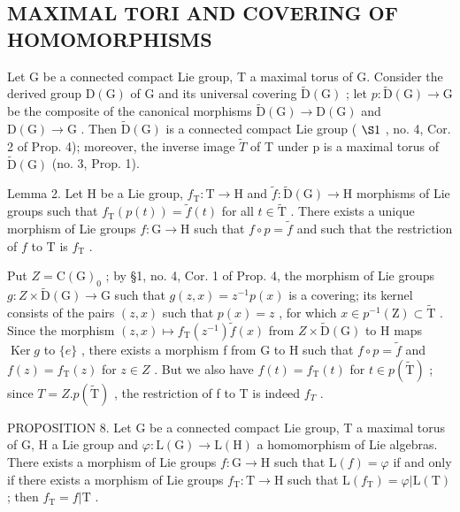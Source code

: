 \subsection{MAXIMAL TORI AND COVERING OF HOMOMORPHISMS}

Let G be a connected compact Lie group, T a maximal torus of G. Consider the derived group \(\mathrm{D}(\mathrm{G})\) of G and its universal covering \(\tilde{\mathrm{D}}(\mathrm{G})\) ; let \(p: \tilde{\mathrm{D}}(\mathrm{G}) \to \mathrm{G}\) be the composite of the canonical morphisms \(\tilde{\mathrm{D}}(\mathrm{G}) \to \mathrm{D}(\mathrm{G})\) and \(\mathrm{D}(\mathrm{G}) \to \mathrm{G}\) . Then \(\tilde{\mathrm{D}}(\mathrm{G})\) is a connected compact Lie group ( \(\S1\) , no. 4, Cor. 2 of Prop. 4); moreover, the inverse image \(\tilde{T}\) of T under p is a maximal torus of \(\tilde{\mathrm{D}}(\mathrm{G})\) (no. 3, Prop. 1).

Lemma 2. Let H be a Lie group, \(f_{\mathrm{T}}: \mathrm{T} \to \mathrm{H}\) and \(\tilde{f}: \tilde{\mathrm{D}}(\mathrm{G}) \to \mathrm{H}\) morphisms of Lie groups such that \(f_{\mathrm{T}}(p(t)) = \tilde{f}(t)\) for all \(t \in \tilde{\mathrm{T}}\) . There exists a unique morphism of Lie groups \(f: \mathrm{G} \to \mathrm{H}\) such that \(f \circ p = \tilde{f}\) and such that the restriction of \(f\) to \(\mathrm{T}\) is \(f_{\mathrm{T}}\) .

Put \(Z = \mathrm{C}(\mathrm{G})_{0}\) ; by §1, no. 4, Cor. 1 of Prop. 4, the morphism of Lie groups \(g: Z \times \tilde{\mathrm{D}}(\mathrm{G}) \to \mathrm{G}\) such that \(g(z, x) = z^{-1} p(x)\) is a covering; its kernel consists of the pairs \((z, x)\) such that \(p(x) = z\) , for which \(x \in p^{-1}(\mathrm{Z}) \subset \tilde{\mathrm{T}}\) . Since the morphism \((z, x) \mapsto f_{\mathrm{T}}(z^{-1}) \tilde{f}(x)\) from \(Z \times \tilde{\mathrm{D}}(\mathrm{G})\) to H maps \(\operatorname{Ker} g\) to \(\{e\}\) , there exists a morphism f from G to H such that \(f \circ p = \tilde{f}\) and \(f(z) = f_{\mathrm{T}}(z)\) for \(z \in Z\) . But we also have \(f(t) = f_{\mathrm{T}}(t)\) for \(t \in p(\tilde{\mathrm{T}})\) ; since \(T = Z.p(\tilde{\mathrm{T}})\) , the restriction of f to T is indeed \(f_{T}\) .

PROPOSITION 8. Let G be a connected compact Lie group, T a maximal torus of G, H a Lie group and \(\varphi : \mathrm{L}(\mathrm{G}) \to \mathrm{L}(\mathrm{H})\) a homomorphism of Lie algebras. There exists a morphism of Lie groups \(f: \mathrm{G} \to \mathrm{H}\) such that \(\mathrm{L}(f) = \varphi\) if and only if there exists a morphism of Lie groups \(f_{\mathrm{T}}: \mathrm{T} \to \mathrm{H}\) such that \(\mathrm{L}(f_{\mathrm{T}}) = \varphi | \mathrm{L}(\mathrm{T})\) ; then \(f_{\mathrm{T}} = f | \mathrm{T}\) .

